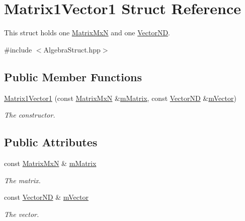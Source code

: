 \hypertarget{struct_matrix1_vector1}{\section{Matrix1\-Vector1 Struct Reference}
\label{struct_matrix1_vector1}
}


This struct holds one \hyperlink{class_matrix_mx_n}{Matrix\-Mx\-N} and one \hyperlink{class_vector_n_d}{Vector\-N\-D}.  




{\ttfamily \#include $<$Algebra\-Struct.\-hpp$>$}

\subsection*{Public Member Functions}
\begin{DoxyCompactItemize}
\item 
\hyperlink{struct_matrix1_vector1_ab63968faa92db39b0418ae6f313a25e1}{Matrix1\-Vector1} (const \hyperlink{class_matrix_mx_n}{Matrix\-Mx\-N} \&\hyperlink{struct_matrix1_vector1_ad92f271648e49bf11330c09e48ff474a}{m\-Matrix}, const \hyperlink{class_vector_n_d}{Vector\-N\-D} \&\hyperlink{struct_matrix1_vector1_a6986b2fafa3d34ea4f3ffc614c12eb7e}{m\-Vector})
\begin{DoxyCompactList}\small\item\em The constructor. \end{DoxyCompactList}\end{DoxyCompactItemize}
\subsection*{Public Attributes}
\begin{DoxyCompactItemize}
\item 
const \hyperlink{class_matrix_mx_n}{Matrix\-Mx\-N} \& \hyperlink{struct_matrix1_vector1_ad92f271648e49bf11330c09e48ff474a}{m\-Matrix}
\begin{DoxyCompactList}\small\item\em The matrix. \end{DoxyCompactList}\item 
const \hyperlink{class_vector_n_d}{Vector\-N\-D} \& \hyperlink{struct_matrix1_vector1_a6986b2fafa3d34ea4f3ffc614c12eb7e}{m\-Vector}
\begin{DoxyCompactList}\small\item\em The vector. \end{DoxyCompactList}\end{DoxyCompactItemize}


